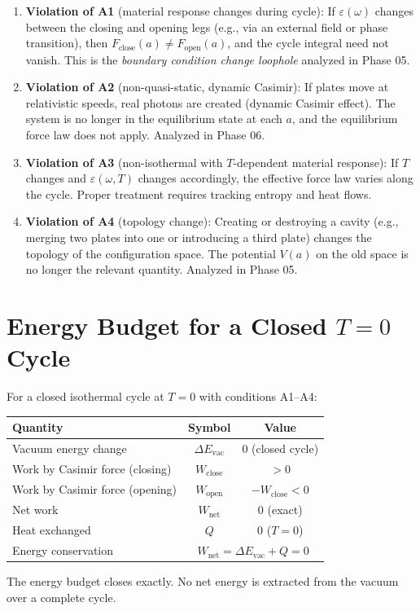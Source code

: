 \documentclass[11pt]{article}
\begin{document}
\begin{enumerate}
  \item \textbf{Violation of A1} (material response changes during cycle):
    If $\varepsilon(\omega)$ changes between the closing and opening
    legs (e.g., via an external field or phase transition), then
    $F_\mathrm{close}(a) \neq F_\mathrm{open}(a)$, and the cycle
    integral need not vanish. This is the \emph{boundary condition
    change loophole} analyzed in Phase 05.

  \item \textbf{Violation of A2} (non-quasi-static, dynamic Casimir):
    If plates move at relativistic speeds, real photons are created
    (dynamic Casimir effect). The system is no longer in the
    equilibrium state at each $a$, and the equilibrium force law
    does not apply. Analyzed in Phase 06.

  \item \textbf{Violation of A3} (non-isothermal with $T$-dependent
    material response): If $T$ changes and $\varepsilon(\omega,T)$
    changes accordingly, the effective force law varies along the
    cycle. Proper treatment requires tracking entropy and heat flows.

  \item \textbf{Violation of A4} (topology change):
    Creating or destroying a cavity (e.g., merging two plates into
    one or introducing a third plate) changes the topology of the
    configuration space. The potential $V(a)$ on the old space is
    no longer the relevant quantity. Analyzed in Phase 05.
\end{enumerate}

\section{Energy Budget for a Closed $T=0$ Cycle}

For a closed isothermal cycle at $T = 0$ with conditions A1--A4:

\begin{center}
\begin{tabular}{l c c}
\hline
Quantity & Symbol & Value \\
\hline
Vacuum energy change & $\Delta E_\mathrm{vac}$ & $0$ (closed cycle) \\
Work by Casimir force (closing) & $W_\mathrm{close}$ & $>0$ \\
Work by Casimir force (opening) & $W_\mathrm{open}$ & $-W_\mathrm{close} < 0$ \\
Net work & $W_\mathrm{net}$ & $0$ (exact) \\
Heat exchanged & $Q$ & $0$ ($T = 0$) \\
\hline
Energy conservation & \multicolumn{2}{c}{$W_\mathrm{net} = \Delta E_\mathrm{vac} + Q = 0$} \\
\hline
\end{tabular}
\end{center}

The energy budget closes exactly. No net energy is extracted from
the vacuum over a complete cycle.
\end{document}
